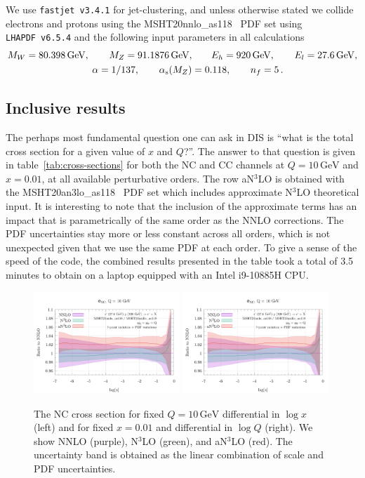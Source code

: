 \documentclass[submission, PhysCodeb]{SciPost}
\newcommand{\as}{\alpha_{\mathrm{s}}}
\newcommand{\GEV}{\,\mathrm{GeV}}
\newcommand{\NNNLO}{N$^3$LO}
\begin{document}
We use {\tt fastjet~v3.4.1} for jet-clustering, and unless otherwise
stated we collide electrons and protons using the
MSHT20nnlo\_as118~\cite{Bailey:2020ooq} PDF set using {\tt
  LHAPDF~v6.5.4} and the following input parameters in all
calculations
\begin{align}
  \label{eq:setup}
  M_W = 80.398\GEV, \qquad M_Z = 91.1876\GEV, &\qquad E_h = 920\GEV, \qquad E_l = 27.6\GEV,  \\ \notag
  \alpha = 1/137, \qquad \as(M_Z) &= 0.118, \qquad n_f = 5\,.
\end{align}

\subsection{Inclusive results}
The perhaps most fundamental question one can ask in DIS is ``what is
the total cross section for a given value of $x$ and $Q$?''. The
answer to that question is given in table~\ref{tab:cross-sections} for
both the NC and CC channels at $Q=10\GEV$ and $x=0.01$, at all
available perturbative orders.  The row a\NNNLO{} is obtained with the
MSHT20an3lo\_as118~\cite{McGowan:2022nag} PDF set which includes
approximate \NNNLO{} theoretical input. It is interesting to note that
the inclusion of the approximate terms has an impact that is
parametrically of the same order as the NNLO corrections. The PDF
uncertainties stay more or less constant across all orders, which is
not unexpected given that we use the same PDF at each order. To give a
sense of the speed of the code, the combined results presented in the
table took a total of 3.5 minutes to obtain on a laptop equipped with
an Intel i9-10885H CPU.
\begin{figure}[tb!]
  \centering\includegraphics[width=0.49\textwidth,page=1]{../paper_runs/inclusive_runs/plot/sigma-ratios.pdf}
  \centering\includegraphics[width=0.49\textwidth,page=3]{../paper_runs/inclusive_runs/plot/sigma-ratios.pdf}
  \caption{The NC cross section for fixed $Q=10\GEV$ differential in
    $\log x$ (left) and for fixed $x=0.01$ and differential in $\log
    Q$ (right). We show NNLO (purple), \NNNLO{} (green), and a\NNNLO{}
    (red). The uncertainty band is obtained as the linear combination
    of scale and PDF uncertainties.}
  \label{fig:sigma}
\end{figure}
\end{document}
